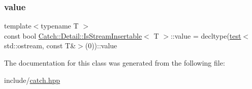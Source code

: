 \subsubsection{\texorpdfstring{value}{value}}
{\footnotesize\ttfamily template$<$typename T $>$ \\
const bool \mbox{\hyperlink{class_catch_1_1_detail_1_1_is_stream_insertable}{Catch\+::\+Detail\+::\+Is\+Stream\+Insertable}}$<$ T $>$\+::value = decltype(\mbox{\hyperlink{class_catch_1_1_detail_1_1_is_stream_insertable_ac5981238a76d66e36b3d014aa870d15c}{test}}$<$std\+::ostream, const T\&$>$(0))\+::value\hspace{0.3cm}{\ttfamily [static]}}



The documentation for this class was generated from the following file\+:\begin{DoxyCompactItemize}
\item 
include/\mbox{\hyperlink{catch_8hpp}{catch.\+hpp}}\end{DoxyCompactItemize}
